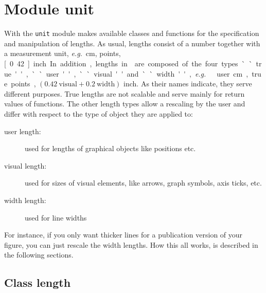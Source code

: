 \chapter{Module unit}
\label{unit}

With the \verb|unit| module \PyX{} makes available classes and
functions for the specification and manipulation of lengths. As usual,
lengths consist of a number together with a measurement unit,
\textit{e.g.}\ \unit[1]{cm}, \unit[50]{points}, \unit[0.42]{inch}.  In 
addition, lengths in \PyX{} are composed of the four types ``true'', 
``user'', ``visual'' and ``width'', \textit{e.g.}\ \unit[1]{user cm}, 
\unit[50]{true points}, $(0.42\ \mathrm{visual} + 0.2\ \mathrm{width})$ inch.  
As their names indicate, they serve different purposes. True lengths are not
scalable and serve mainly for return values of \PyX{} functions.  The
other length types allow a rescaling by the user and differ with
respect to the type of object they are applied to:

\begin{description}
\item[user length:] used for lengths of graphical objects like
  positions etc.
\item[visual length:] used for sizes of visual elements, like arrows,
  graph symbols, axis ticks, etc.
\item[width length:] used for line widths
\end{description}

For instance, if you only want thicker lines for a publication
version of your figure, you can just rescale the width lengths. How
this all works, is described in the following sections.

\section{Class length}

